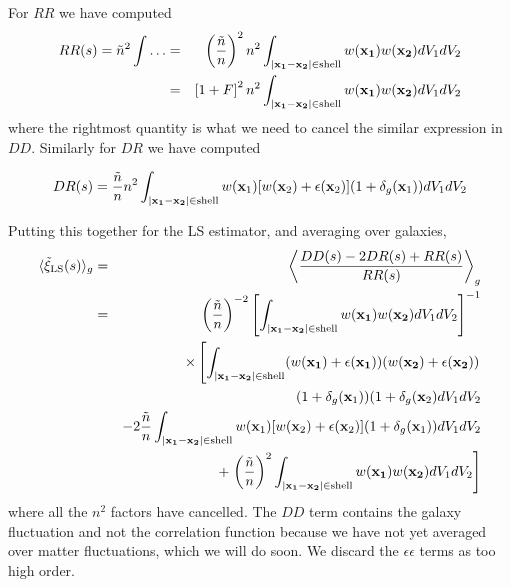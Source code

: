 \begin{subappendices}
For $RR$ we have computed
\begin{eqnarray}
  RR(s) = \tilde n^2 \int \dots  &=& \left( \frac{\tilde n}{n} \right)^2 n^2 \int_{|\mathbf{x_1 - x_2}| \in \mbox{\scriptsize shell}}  w(\mathbf{x_1}) w(\mathbf{x_2}) {dV_1}{dV_2} \\
  &=& \left[ 1 +   F \right]^2 n^2 \int_{|\mathbf{x_1 - x_2}| \in \mbox{\scriptsize shell}}  w(\mathbf{x_1}) w(\mathbf{x_2}) {dV_1}{dV_2} \nonumber
\end{eqnarray}
where the rightmost quantity is what we need to cancel the similar expression in $DD$.  Similarly for $DR$ we have computed

\begin{eqnarray}
DR(s) = \frac{\tilde n}{n} n^2 \int_{|\mathbf{x_1 - x_2}| \in \mbox{\scriptsize shell}} w(\mathbf x_1) [w(\mathbf x_2) + \epsilon(\mathbf x_2) ] (1 + \delta_g(\mathbf x_1)) dV_1 dV_2
\end{eqnarray}

Putting this together for the LS estimator, and averaging over galaxies, 
\begin{eqnarray}
\langle \tilde \xi_{\rm LS}(s)\rangle_g  &=&  \left\langle \frac{ DD(s) - 2 DR(s) + RR(s)}{RR(s)} \right\rangle_g  \\&=&    \left( \frac{\tilde n}{n} \right)^{-2} \left[ \int_{|\mathbf{x_1 - x_2}| \in \mbox{\scriptsize shell}}  w(\mathbf{x_1}) w(\mathbf{x_2}) {dV_1}{dV_2} \right]^{-1}  \\ \nonumber
&& \times \left[ \int_{|\mathbf{x_1 - x_2}| \in \mbox{\scriptsize shell}}  (w(\mathbf{x_1}) +\epsilon(\mathbf{x_1}) )( w(\mathbf{x_2}) + \epsilon(\mathbf{x_2}) ) \right.\\ \nonumber
  && (1+\delta_g(\mathbf x_1))(1+\delta_g(\mathbf x_2) {dV_1}{dV_2}   \\ \nonumber
  && -2 \frac{\tilde n}{n} \int_{|\mathbf{x_1 - x_2}| \in \mbox{\scriptsize shell}} w(\mathbf x_1) [w(\mathbf x_2) + \epsilon(\mathbf x_2) ] (1 + \delta_g(\mathbf x_1)) dV_1 dV_2 \\ \nonumber
  &&+ \left. \left( \frac{\tilde n}{n} \right)^2  \int_{|\mathbf{x_1 - x_2}| \in \mbox{\scriptsize shell}}  w(\mathbf{x_1}) w(\mathbf{x_2}) {dV_1}{dV_2} \right]
\end{eqnarray}
where all the $n^2$ factors have cancelled.  The $DD$ term contains the galaxy fluctuation and not the correlation function because we have not yet averaged over matter fluctuations, which we will do soon.  We discard the $\epsilon \epsilon$ terms as too high order.


\end{subappendices}
